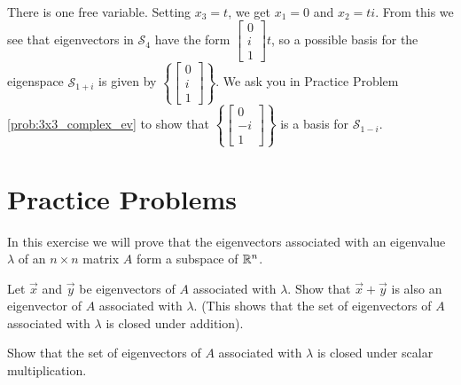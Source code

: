 \documentclass{ximera}
\begin{document}
\begin{example}
\begin{explanation}
\begin{align*}
\end{align*}
There is one free variable.  Setting $x_3=t$, we get $x_1=0$ and $x_2=ti$.  From this we see that eigenvectors in $\mathcal{S}_4$ have the form $\begin{bmatrix}0\\i\\1\end{bmatrix}t$, so a possible basis for the eigenspace $\mathcal{S}_{1+i}$ is given by $\left\{\begin{bmatrix}0\\i\\1\end{bmatrix}\right\}$.
We ask you in Practice Problem \ref{prob:3x3_complex_ev} to show that $\left\{\begin{bmatrix}0\\-i\\1\end{bmatrix}\right\}$ is a basis for $\mathcal{S}_{1-i}$.
\end{explanation}
\end{example}

\section*{Practice Problems}

\begin{problem}
In this exercise we will prove that the eigenvectors associated with an eigenvalue $\lambda$ of an $n \times n$ matrix $A$ form a subspace of $\mathbb{R}^n$.
\begin{problem}\label{prob:eigenspace1}
Let $\vec{x}$ and $\vec{y}$ be eigenvectors of $A$ associated with $\lambda$.  Show that $\vec{x}+\vec{y}$ is also an eigenvector of $A$ associated with $\lambda$.  (This shows that the set of eigenvectors of $A$ associated with $\lambda$ is closed under addition).
\end{problem}
\begin{problem}\label{prob:eigenspace2}
Show that the set of eigenvectors of $A$ associated with $\lambda$ is closed under scalar multiplication.
\end{problem}
\end{problem}
\end{document}
